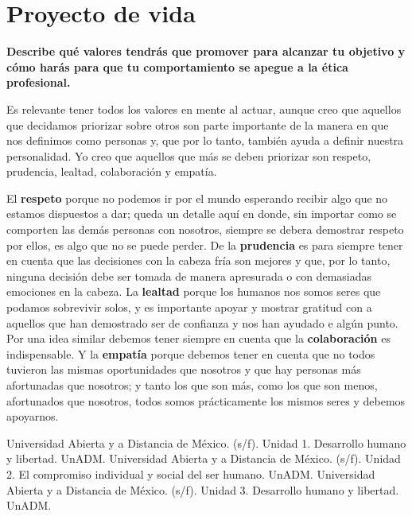 \documentclass[12pt]{article}
\begin{document}
\section*{Proyecto de vida}
\noindent \textbf{Describe qué valores tendrás que promover para alcanzar tu objetivo y cómo harás para que tu comportamiento se apegue a la ética profesional.} 
	\ \\ 
	\par Es relevante tener todos los valores en mente al actuar, aunque creo que aquellos que decidamos priorizar sobre otros son parte importante de la manera en que nos definimos como personas y, que por lo tanto, también ayuda a definir nuestra personalidad. Yo creo que aquellos que más se deben priorizar son respeto, prudencia, lealtad, colaboración y empatía. 
	\par El \textbf{respeto} porque no podemos ir por el mundo esperando recibir algo que no estamos dispuestos a dar; queda un detalle aquí en donde, sin importar como se comporten las demás personas con nosotros, siempre se debera demostrar respeto por ellos, es algo que no se puede perder. De la \textbf{prudencia} es para siempre tener en cuenta que las decisiones con la cabeza fría son mejores y que, por lo tanto, ninguna decisión debe ser tomada de manera apresurada o con demasiadas emociones en la cabeza. La \textbf{lealtad} porque los humanos nos somos seres que podamos sobrevivir solos, y es importante apoyar y mostrar gratitud con a aquellos que han demostrado ser de confianza y nos han ayudado e algún punto. Por una idea similar debemos tener siempre en cuenta que la \textbf{colaboración} es indispensable. Y la \textbf{empatía} porque debemos tener en cuenta que no todos tuvieron las mismas oportunidades que nosotros y que hay personas más afortunadas que nosotros; y tanto los que son más, como los que son menos, afortunados que nosotros, todos somos prácticamente los mismos seres y debemos apoyarnos.



\begin{thebibliography}{X}
	
	 Universidad Abierta y a Distancia de México. (s/f). Unidad 1. Desarrollo humano y libertad. UnADM.
	 Universidad Abierta y a Distancia de México. (s/f). Unidad 2. El compromiso individual y social del ser humano. UnADM.
	 Universidad Abierta y a Distancia de México. (s/f). Unidad 3. Desarrollo humano y libertad. UnADM.


\end{thebibliography}
\end{document}
